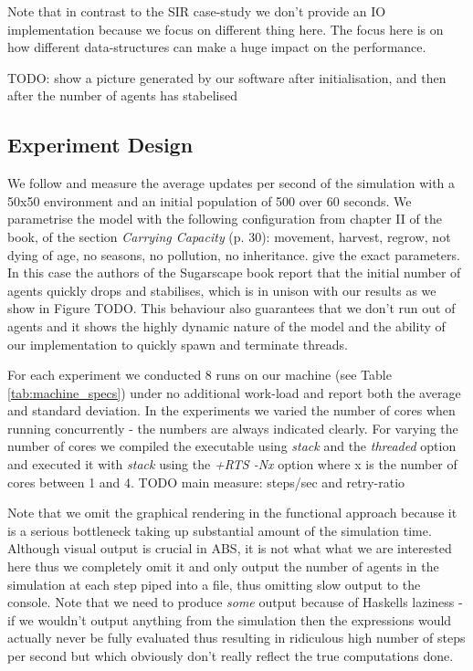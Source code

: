 Note that in contrast to the SIR case-study we don't provide an IO implementation because we focus on different thing here. The focus here is on how different data-structures can make a huge impact on the performance.

TODO: show a picture generated by our software after initialisation, and then after the number of agents has stabelised

\subsection{Experiment Design}
We follow \cite{lysenko_framework_2008} and measure the average updates per second of the simulation with a 50x50 environment and an initial population of 500 over 60 seconds. We parametrise the model with the following configuration from chapter II of the book, of the section \textit{Carrying Capacity} (p. 30): movement, harvest, regrow, not dying of age, no seasons, no pollution, no inheritance. give the exact parameters. In this case the authors of the Sugarscape book report that the initial number of agents quickly drops and stabilises, which is in unison with our results as we show in Figure TODO. This behaviour also guarantees that we don't run out of agents and it shows the highly dynamic nature of the model and the ability of our implementation to quickly spawn and terminate threads.

For each experiment we conducted 8 runs on our machine (see Table \ref{tab:machine_specs}) under no additional work-load and report both the average and standard deviation. In the experiments we varied the number of cores when running concurrently - the numbers are always indicated clearly. For varying the number of cores we compiled the executable using \textit{stack} and the \textit{threaded} option and executed it with \textit{stack} using the \textit{+RTS -Nx} option where x is the number of cores between 1 and 4. TODO main measure: steps/sec and retry-ratio

Note that we omit the graphical rendering in the functional approach because it is a serious bottleneck taking up substantial amount of the simulation time. Although visual output is crucial in ABS, it is not what what we are interested here thus we completely omit it and only output the number of agents in the simulation at each step piped into a file, thus omitting slow output to the console. Note that we need to produce \textit{some} output because of Haskells laziness - if we wouldn't output anything from the simulation then the expressions would actually never be fully evaluated thus resulting in ridiculous high number of steps per second but which obviously don't really reflect the true computations done.

